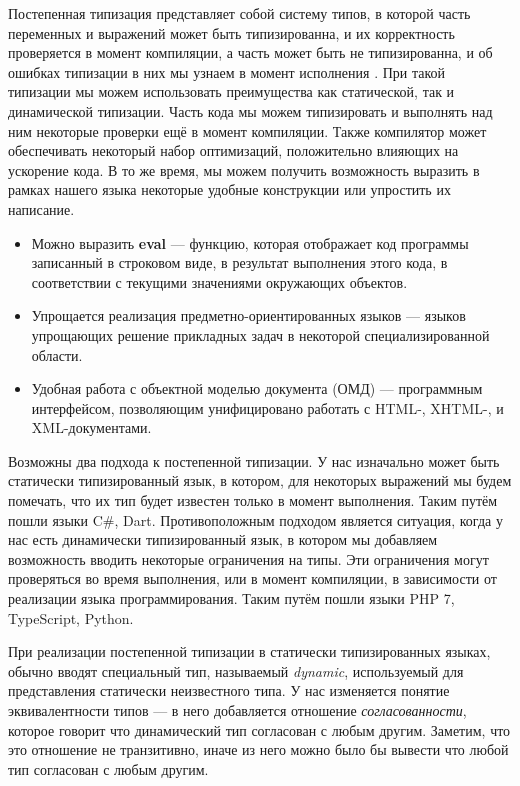 Постепенная типизация представляет собой систему типов, в которой часть переменных и выражений может быть типизированна, и их корректность проверяется в момент компиляции, а часть может быть не типизированна, и об ошибках типизации в них мы узнаем в момент исполнения \cite{gradual:siek2006gradual} \cite{gradual:siek2007gradual}. При такой типизации мы можем использовать преимущества как статической, так и динамической типизации. Часть кода мы можем типизировать и выполнять над ним некоторые проверки ещё в момент компиляции. Также компилятор может обеспечивать некоторый набор оптимизаций, положительно влияющих на ускорение кода. В то же время, мы можем получить возможность выразить в рамках нашего языка некоторые удобные конструкции или упростить их написание.

\begin{itemize}
    \item Можно выразить \textbf{eval} --- функцию, которая отображает код программы записанный в строковом виде, в результат выполнения этого кода, в соответствии с текущими значениями окружающих объектов.
    \item Упрощается реализация предметно-ориентированных языков --- языков упрощающих решение прикладных задач в некоторой специализированной области.
    \item Удобная работа с объектной моделью документа (ОМД) --- программным интерфейсом, позволяющим унифицировано работать с HTML-, XHTML-, и XML-документами.
\end{itemize}

Возможны два подхода к постепенной типизации. У нас изначально может быть статически типизированный язык, в котором, для некоторых выражений мы будем помечать, что их тип будет известен только в момент выполнения. Таким путём пошли языки C{\#}, Dart. Противоположным подходом является ситуация, когда у нас есть динамически типизированный язык, в котором мы добавляем возможность вводить некоторые ограничения на типы. Эти ограничения могут проверяться во время выполнения, или в момент компиляции, в зависимости от реализации языка программирования. Таким путём пошли языки PHP 7, TypeScript, Python.

При реализации постепенной типизации в статически типизированных языках, обычно вводят специальный тип, называемый \textit{dynamic}, используемый для представления статически неизвестного типа. У нас изменяется понятие эквивалентности типов --- в него добавляется отношение \textit{согласованности}, которое говорит что динамический тип согласован с любым другим. Заметим, что это отношение не транзитивно, иначе из него можно было бы вывести что любой тип согласован с любым другим.


